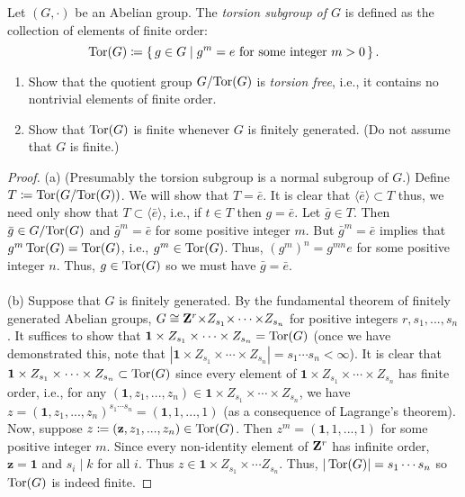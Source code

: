 \begin{problem}
Let $(G,\cdot)$ be an Abelian group. The \emph{torsion subgroup of $G$} is
defined as the collection of elements of finite order:
\[
\operatorname{Tor}(G)\coloneqq
\left\{\,g\in G\;\middle|\;\text{$g^m=e$ for some integer $m>0$}\,\right\}.
\]
\begin{enumerate}[noitemsep,label=(\alph*)]
\item Show that the quotient group $G/{\operatorname{Tor}(G)}$ is \emph{torsion free},
  i.e., it contains no nontrivial elements of finite order.
\item Show that $\operatorname{Tor}(G)$ is finite whenever $G$ is finitely generated. (Do
  not assume that $G$ is finite.)
\end{enumerate}
\end{problem}
\begin{proof}
(a) (Presumably the torsion subgroup is a normal subgroup of $G$.) Define
$T\coloneqq\operatorname{Tor}(G/{\operatorname{Tor}(G)})$. We will show that $T=\bar e$. It is clear
that $\langle\bar e\rangle\subset T$ thus, we need only show that $T\subset
\langle\bar e\rangle$, i.e., if $t\in T$ then $g=\bar e$. Let $\bar g\in
T$. Then $\bar g\in G/{\operatorname{Tor}(G)}$ and $\bar g^m=\bar e$ for some positive
integer $m$. But $\bar g^m=\bar e$ implies that $g^m\operatorname{Tor}(G)=\operatorname{Tor}(G)$, i.e.,
$g^m\in\operatorname{Tor}(G)$. Thus, $(g^m)^n=g^{mn}e$ for some positive integer
$n$. Thus, $g\in\operatorname{Tor}(G)$ so we must have $\bar g=\bar e$.
\\\\
(b) Suppose that $G$ is finitely generated. By the fundamental theorem of
finitely generated Abelian groups, $G\cong\mathbf{Z}^r{\times}
Z_{s_1}{\times}\cdots{\times}Z_{s_n}$ for positive integers
$r,s_1,...,s_n$. It suffices to show that $\mathbf{1}\times
Z_{s_1}\times\cdots\times Z_{s_n}=\operatorname{Tor}(G)$ (once we have demonstrated this,
note that $\left|\mathbf{1}\times Z_{s_1}\times\cdots\times
  Z_{s_n}\right|=s_1\cdots s_n<\infty$). It is clear that $\mathbf{1}\times
Z_{s_1}\times\cdots\times Z_{s_n}\subset\operatorname{Tor}(G)$ since every element of
$\mathbf{1}\times Z_{s_1}\times\cdots\times Z_{s_n}$ has finite order,
i.e., for any $(\mathbf{1},z_1,...,z_n)\in \mathbf{1}\times
Z_{s_1}\times\cdots\times Z_{s_n}$, we have
$z=(\mathbf{1},z_1,...,z_n)^{s_1\cdots s_n}=(\mathbf{1},1,...,1)$ (as a
consequence of Lagrange's theorem). Now, suppose $z\coloneqq
(\mathbf{z},z_1,...,z_n)\in\operatorname{Tor}(G)$. Then $z^m=(\mathbf{1},1,...,1)$ for
some positive integer $m$. Since every non-identity element of $\mathbf{Z}^r$ has
infinite order, $\mathbf{z}=\mathbf{1}$ and $s_i\mid k$ for all $i$. Thus
$z\in\mathbf{1}\times Z_{s_1}\times\cdots Z_{s_n}$. Thus,
$|\operatorname{Tor}(G)|=s_1\cdots s_n$ so $\operatorname{Tor}(G)$ is indeed finite.
\end{proof}


